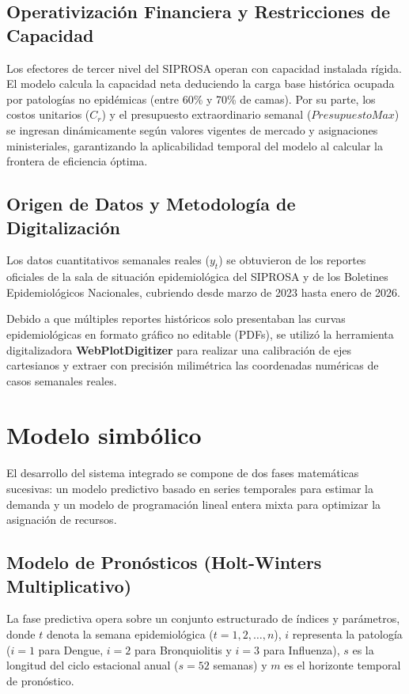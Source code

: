 \documentclass[conference]{IEEEtran}
\begin{document}
\subsection{Operativización Financiera y Restricciones de Capacidad}
Los efectores de tercer nivel del SIPROSA operan con capacidad instalada rígida. El modelo calcula la capacidad neta deduciendo la carga base histórica ocupada por patologías no epidémicas (entre 60\% y 70\% de camas). Por su parte, los costos unitarios ($C_r$) y el presupuesto extraordinario semanal ($PresupuestoMax$) se ingresan dinámicamente según valores vigentes de mercado y asignaciones ministeriales, garantizando la aplicabilidad temporal del modelo al calcular la frontera de eficiencia óptima.

\subsection{Origen de Datos y Metodología de Digitalización}
Los datos cuantitativos semanales reales ($y_t$) se obtuvieron de los reportes oficiales de la sala de situación epidemiológica del SIPROSA y de los Boletines Epidemiológicos Nacionales, cubriendo desde marzo de 2023 hasta enero de 2026.

Debido a que múltiples reportes históricos solo presentaban las curvas epidemiológicas en formato gráfico no editable (PDFs), se utilizó la herramienta digitalizadora \textbf{WebPlotDigitizer} para realizar una calibración de ejes cartesianos y extraer con precisión milimétrica las coordenadas numéricas de casos semanales reales.

\section{Modelo simbólico}
El desarrollo del sistema integrado se compone de dos fases matemáticas sucesivas: un modelo predictivo basado en series temporales para estimar la demanda y un modelo de programación lineal entera mixta para optimizar la asignación de recursos.

\subsection{Modelo de Pronósticos (Holt-Winters Multiplicativo)}
La fase predictiva opera sobre un conjunto estructurado de índices y parámetros, donde $t$ denota la semana epidemiológica ($t = 1, 2, \dots, n$), $i$ representa la patología ($i = 1$ para Dengue, $i = 2$ para Bronquiolitis y $i = 3$ para Influenza), $s$ es la longitud del ciclo estacional anual ($s = 52$ semanas) y $m$ es el horizonte temporal de pronóstico.
\end{document}
